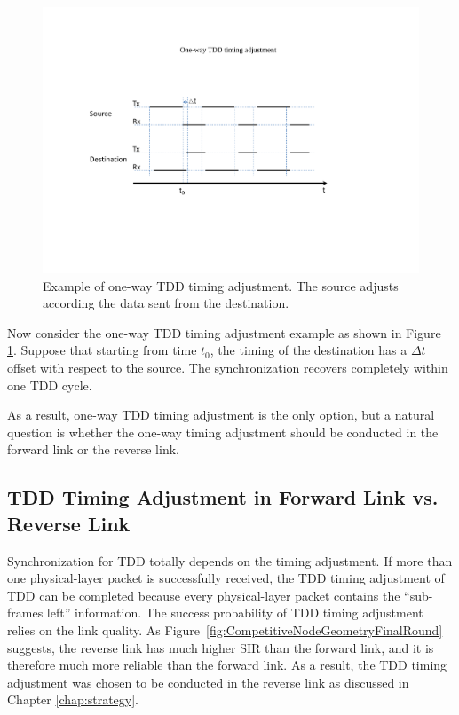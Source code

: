 \begin{figure}[tpb]
  \begin{center}
    \centerline{\includegraphics[width=160mm]{TDDoneWayAdjustment.pdf}}
    \caption{Example of one-way TDD timing adjustment. The source adjusts according the data sent from the destination.}
    \label{fig:TDDoneWayAdjustment}
  \end{center}
\end{figure}

Now consider the one-way TDD timing adjustment example as shown in Figure \ref{fig:TDDoneWayAdjustment}. Suppose that starting from time $t_0$, the timing of the destination has a $\Delta t$ offset with respect to the source. The synchronization recovers completely within one TDD cycle.

As a result, one-way TDD timing adjustment is the only option, but a natural question is whether the one-way timing adjustment should be conducted in the forward link or the reverse link.

\subsection{TDD Timing Adjustment in Forward Link vs. Reverse Link}
\label{TDDTimingAdjustemntForwardReverse}
Synchronization for TDD totally depends on the timing adjustment. If more than one physical-layer packet is successfully received, the TDD timing adjustment of TDD can be completed because every physical-layer packet contains the ``sub-frames left'' information. The success probability of TDD timing adjustment relies on the link quality. As Figure~\ref{fig:CompetitiveNodeGeometryFinalRound} suggests, the reverse link has much higher SIR than the forward link, and it is therefore much more reliable than the forward link. As a result, the TDD timing adjustment was chosen to be conducted in the reverse link as discussed in Chapter \ref{chap:strategy}.

